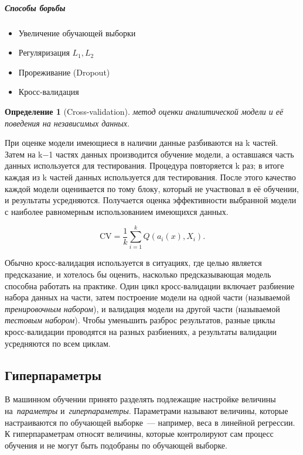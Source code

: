 \documentclass[a4paper, 12pt]{article}
\theoremstyle{plain} %
\newtheorem{definition}{Определение}
\theoremstyle{definition} %
\theoremstyle{remark} %
\begin{document}
\newpage
\subparagraph{Способы борьбы}

\begin{itemize}
	\item Увеличение обучающей выборки
	\item Регуляризация $L_1, L_2$
	\item Прореживание (Dropout)
	\item Кросс-валидация
\end{itemize}

\begin{definition}[Cross-validation]
	метод оценки аналитической модели и её поведения на независимых данных.
\end{definition}
	При оценке модели имеющиеся в наличии данные разбиваются на k частей. Затем на k−1 частях данных производится обучение модели, а оставшаяся часть данных используется для тестирования. Процедура повторяется k раз; в итоге каждая из k частей данных используется для тестирования. После этого качество каждой модели оценивается по тому блоку, который не участвовал в её обучении,
	и результаты усредняются. Получается оценка эффективности выбранной модели с наиболее равномерным использованием имеющихся данных.

	\[
	    \text{CV}
	    =
	    \frac{1}{k}
	    \sum_{i = 1}^{k}
	        Q\left( a_i(x), X_i \right).
	\]

\vspace{1em}
	Обычно кросс-валидация используется в ситуациях, где целью является предсказание, и хотелось бы оценить, насколько предсказывающая модель способна работать на практике. Один цикл кросс-валидации включает разбиение набора данных на части, затем построение модели на одной части (называемой \emph{тренировочным набором}), и валидация модели на другой части (называемой \emph{тестовым набором}). Чтобы уменьшить разброс результатов, разные циклы кросс-валидации проводятся на разных разбиениях, а результаты валидации усредняются по всем циклам.

\subsection{Гиперпараметры}

	В машинном обучении принято разделять подлежащие настройке величины
	на~\emph{параметры} и~\emph{гиперпараметры}.
	Параметрами называют величины, которые настраиваются по обучающей выборке~--- например,
	веса в линейной регрессии.
	К гиперпараметрам относят величины, которые контролируют сам процесс обучения и
	не могут быть подобраны по обучающей выборке.
\end{document}
